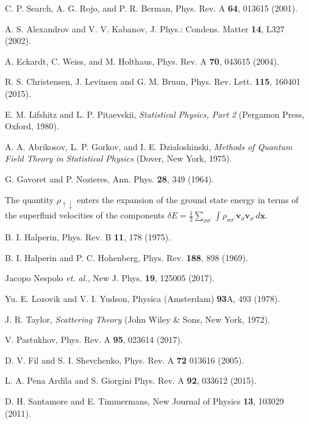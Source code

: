\documentclass[reprint,superscriptaddress,showpacs,nofootinbib,aps,pra]{revtex4-1}
\begin{document}
\begin{thebibliography}{99}
 C. P. Search, A. G. Rojo, and P. R. Berman, Phys. Rev. A \textbf{64}, 013615 (2001).

 A. S. Alexandrov and V. V. Kabanov, J. Phys.: Condens. Matter \textbf{14}, L327 (2002).

 A. Eckardt, C. Weiss, and M. Holthaus, Phys. Rev. A \textbf{70}, 043615 (2004).

 R. S. Christensen, J. Levinsen and G. M. Bruun, Phys. Rev. Lett. \textbf{115}, 160401 (2015). 

 E. M. Lifshitz and L. P. Pitaevskii, \textit{Statistical Physics, Part 2} (Pergamon Press, Oxford, 1980).

 A. A. Abrikosov, L. P. Gorkov, and I. E. Dzialoshinski, \textit{Methods of Quantum Field Theory in Statistical Physics} (Dover, New York, 1975).

 G. Gavoret and P. Nozieres, Ann. Phys. \textbf{28}, 349 (1964).

 The quantity $\rho_{\uparrow\downarrow}$ enters the expansion of the ground state energy in terms of the superfluid velocities of the components $\delta E=\frac{1}{2}\sum\limits_{\sigma\sigma^\prime} \int \rho_{\sigma\sigma^\prime} \bm v_\sigma \bm v_{\sigma^\prime} d\bm x$.
    
 B. I. Halperin, Phys. Rev. B \textbf{11}, 178 (1975).

 B. I. Halperin and P. C. Hohenberg, Phys. Rev. \textbf{188}, 898 (1969).

 Jacopo Nespolo \textit{et. al.}, New J. Phys. \textbf{19}, 125005 (2017).

 Yu. E. Lozovik and V. I. Yudson, Physica (Amsterdam) \textbf{93}A, 493 (1978).

 J. R. Taylor, \textit{Scattering Theory} (John Wiley \& Sons, New York, 1972).

 V. Pastukhov, Phys. Rev. A \textbf{95}, 023614 (2017).

 D. V. Fil and S. I. Shevchenko, Phys. Rev. A \textbf{72} 013616 (2005).

 L. A. Pena Ardila and S. Giorgini
Phys. Rev. A \textbf{92}, 033612 (2015).

 D. H. Santamore and E. Timmermans, New Journal of Physics \textbf{13}, 103029 (2011).  


\end{thebibliography}
\end{document}
